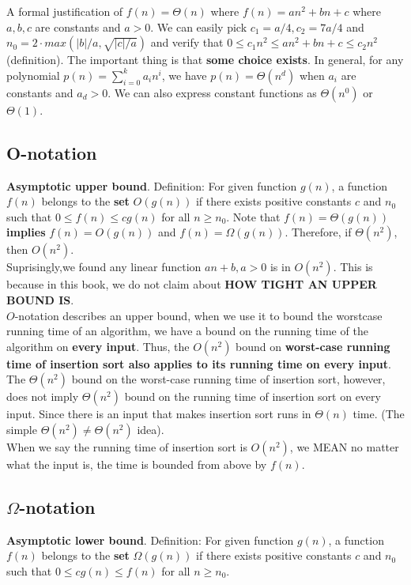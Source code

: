 \documentclass{article}
\begin{document}
A formal justification of  $f(n) = \Theta (n)$ where $f(n) = an^2+bn+c$ where $a,b,c$ are constants and $a > 0$. We can easily pick $c_1 = a/4, c_2 = 7a/4$ and $n_0 = 2 \cdot max(|b|/a, \sqrt{|c|/a})$ and verify that 
$0 \leq c_1n^2\leq an^2+bn+c\leq c_2n^2$ (definition). The important thing is that \textbf{some choice exists}. In general, for any polynomial $p(n)=\sum_{i=0}^{k}a_in^i$, we have $p(n) =\Theta(n^d)$ when $a_i$ are constants and $a_d>0$. We can also express constant functions as $\Theta(n^0)$ or $\Theta(1)$.

\subsection*{O-notation}

\textbf{Asymptotic upper bound}. 
Definition: For given function $g(n)$, a function $f(n)$ belongs to the \textbf{set} $O(g(n))$ if there exists positive constants $c$ and $n_0$ such that $0 \leq f(n)\leq cg(n)$ for all $n \geq n_0$. Note that $f(n) = \Theta(g(n))$ \textbf{implies} $f(n) = O(g(n))$ and $f(n) = \Omega(g(n))$. Therefore, if $\Theta (n^2)$, then $O(n^2)$.\\

Suprisingly,we found any linear function $an+b, a>0$ is in $O(n^2)$. This is because in this book, we do not claim about \textbf{HOW TIGHT AN UPPER BOUND IS}. \\

$O$-notation describes an upper bound, when we use it to bound the worstcase
running time of an algorithm, we have a bound on the running time of the algorithm
on \textbf{every input}. Thus, the $O(n^2)$
bound on \textbf{worst-case running time of insertion sort also applies to its running time
on every input}. The $\Theta(n^2)$ bound on the worst-case running time of insertion sort,
however, does not imply $\Theta(n^2)$ bound on the running time of insertion sort on
every input. Since there is an input that makes insertion sort runs in $\Theta(n)$ time. (The simple $\Theta(n^2) \neq \Theta(n^2)$ idea).\\

When we say the running time of insertion sort is $O(n^2)$, we MEAN no matter what the input is, the time is bounded from above by $f(n)$.


\subsection*{$\Omega$-notation}
\textbf{Asymptotic lower bound}. 
Definition: For given function $g(n)$, a function $f(n)$ belongs to the \textbf{set} $\Omega(g(n))$ if there exists positive constants $c$ and $n_0$ such that $0 \leq cg(n) \leq f(n)$ for all $n \geq n_0$.\\
\end{document}
